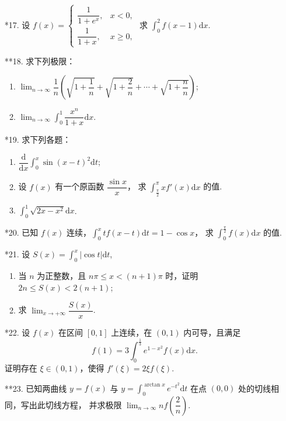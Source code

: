 \begin{enumerate}
    \item[*17.] 设 $f(x)=\begin{cases}
        \dfrac{1}{1+e^x},&x<0,\\
        \dfrac{1}{1+x},&x\geqslant0,
    \end{cases}$ 求 $\displaystyle\int_0^2f(x-1)\text{d}x$.

    \item[**18.] 求下列极限：
    \begin{enumerate}[(1)]\setlength{\itemsep}{5pt}\setlength{\topsep}{15pt}
        \item $\displaystyle\lim_{n\to\infty}\dfrac{1}{n}\left(\sqrt{1+\dfrac{1}{n}}+\sqrt{1+\dfrac{2}{n}}+\cdots+\sqrt{1+\dfrac{n}{n}}\right)$;
        \item $\displaystyle\lim_{n\to\infty}\int_0^1\dfrac{x^n}{1+x}\text{d}x$.
    \end{enumerate}

    \item[*19.] 求下列各题：
    \begin{enumerate}[(1)]\setlength{\itemsep}{5pt}\setlength{\topsep}{15pt}
        \item $\displaystyle\dfrac{\text{d}}{\text{d}x}\int_0^x\sin(x-t)^2\text{d}t$;
        \item 设 $f(x)$ 有一个原函数 $\dfrac{\sin x}{x}$，
        求 $\displaystyle\int_{\frac{\pi}{2}}^{\pi}xf'(x)\text{d}x$ 的值.
        \item $\displaystyle \int_0^1\sqrt{2x-x^2}\text{d}x$.
    \end{enumerate}

    \item[*20.] 已知 $f(x)$ 连续，$\displaystyle \int_0^xtf(x-t)\text{d}t=1-\cos x$，
    求 $\displaystyle\int_0^{\frac{\pi}{2}}f(x)\text{d}x$ 的值.

    \item[*21.] 设 $\displaystyle S(x)=\int_0^x|\cos t|\text{d}t$,
    \begin{enumerate}[(1)]\setlength{\itemsep}{5pt}\setlength{\topsep}{15pt}
        \item 当 $n$ 为正整数，且 $n\pi\leqslant x<(n+1)\pi$ 时，证明 $2n\leqslant S(x)< 2(n+1)$;
        \item 求 $\displaystyle\lim_{x\to+\infty}\dfrac{S(x)}{x}$.
    \end{enumerate}

    \item[*22.] 设 $f(x)$ 在区间 $[0,1]$ 上连续，在 $(0,1)$ 内可导，且满足
    \[
        f(1)=3\int_0^{\frac{1}{3}}e^{1-x^2}f(x)\text{d}x.
    \] 
    证明存在 $\xi\in(0,1)$，使得 $f'(\xi)=2\xi f(\xi)$.

    \item[**23.] 已知两曲线 $y=f(x)$ 与 $\displaystyle y=\int_0^{\arctan x}e^{-t^2}\text{d}t$ 
    在点 $(0,0)$ 处的切线相同，写出此切线方程，
    并求极限 $\displaystyle \lim_{n\to\infty} nf\left(\dfrac{2}{n}\right)$.

\end{enumerate}